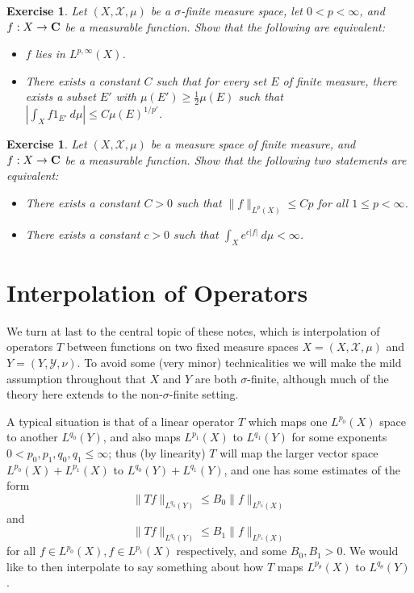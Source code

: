 \documentclass[10pt,reqno]{amsart}
\newtheorem{exercise}[theorem]{Exercise}
\begin{document}
\begin{exercise}
    Let $(X,{\mathcal X},\mu)$ be a $\sigma$-finite measure space, let $0 < p < \infty$, and $f: X \rightarrow {\bf C}$ be a measurable function. Show that the following are equivalent:
    \begin{itemize}
        \item $f$ lies in $L^{p,\infty}(X)$.
        \item There exists a constant $C$ such that for every set $E$ of finite measure, there exists a subset $E'$ with $\mu(E') \geq \frac{1}{2} \mu(E)$ such that $|\int_X f 1_{E'}\ d\mu| \leq C \mu(E)^{1/p'}$.
    \end{itemize}
\end{exercise}

\begin{exercise}
    Let $(X,{\mathcal X},\mu)$ be a measure space of finite measure, and $f: X \rightarrow {\bf C}$ be a measurable function. Show that the following two statements are equivalent:
    \begin{itemize}
        \item There exists a constant $C > 0$ such that $\|f\|_{L^p(X)} \leq Cp$ for all $1 \leq p < \infty$.
        \item There exists a constant $c > 0$ such that $\int_X e^{c|f|}\ d\mu < \infty$.
    \end{itemize}
\end{exercise}

\section{Interpolation of Operators}

We turn at last to the central topic of these notes, which is interpolation of operators $T$ between functions on two fixed measure spaces $X = (X,{\mathcal X},\mu)$ and $Y = (Y,{\mathcal Y},\nu)$. To avoid some (very minor) technicalities we will make the mild assumption throughout that $X$ and $Y$ are both $\sigma$-finite, although much of the theory here extends to the non-$\sigma$-finite setting.

A typical situation is that of a linear operator $T$ which maps one $L^{p_0}(X)$ space to another $L^{q_0}(Y)$, and also maps $L^{p_1}(X)$ to $L^{q_1}(Y)$ for some exponents $0 < p_0,p_1,q_0,q_1 \leq \infty$; thus (by linearity) $T$ will map the larger vector space $L^{p_0}(X) + L^{p_1}(X)$ to $L^{q_0}(Y) + L^{q_1}(Y)$, and one has some estimates of the form
%
\begin{equation} \| T f \|_{L^{q_0}(Y)} \leq B_0 \| f\|_{L^{p_0}(X)} \end{equation}
%
and
%
\begin{equation} \| T f \|_{L^{q_1}(Y)} \leq B_1 \| f\|_{L^{p_1}(X)} \end{equation}
%
for all $f \in L^{p_0}(X), f \in L^{p_1}(X)$ respectively, and some $B_0, B_1 > 0$. We would like to then interpolate to say something about how $T$ maps $L^{p_\theta}(X)$ to $L^{q_\theta}(Y)$.
\end{document}
